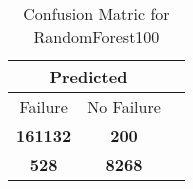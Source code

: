 \begin{table}[] 
\caption{Confusion Matric for RandomForest100} 
\label{Table: Prediction Accuracy-NoneRandomForest10090.0EKF-ignoreReflection-Reflection} 
\centering 
\begin{tabular} 
 {@{}ccc@{}} 
\toprule 
\multicolumn{2}{c}{\textbf{Predicted}}
 \\ \midrule 
\multicolumn{1}{|c|}{Failure} & 
\multicolumn{1}{c|}{No Failure}
 \\ \midrule 
\multicolumn{1}{|c|}{\color{green}\textbf{161132}} & 
\multicolumn{1}{c|}{\color{red}\textbf{200}}
 \\ \midrule 
\multicolumn{1}{|c|}{\color{red}\textbf{528}} & 
\multicolumn{1}{c|}{\color{green}\textbf{8268}}
 \\ \bottomrule 
\end{tabular} 
\end{table} 

